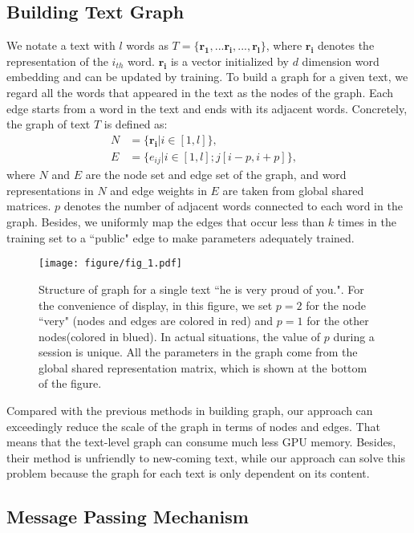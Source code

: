 \documentclass[11pt,a4paper]{article}
\begin{document}
\subsection{Building Text Graph}\label{graph_def}


We notate a text with $l$ words as $T=\{\mathbf{r_1},...\mathbf{r_i},...,\mathbf{r_l}\}$, where $\mathbf{r_i}$ denotes the representation of  the $i_{th}$ word.
$\mathbf{r_i}$ is a vector initialized by $d$ dimension word embedding and can be updated by training. To build a graph for a given text, we regard all the words that appeared in the text as the nodes of the graph. Each edge starts from a word in the text and ends with its adjacent words. Concretely, the graph of text $T$ is defined as:
\begin{align}
    N &= \{\mathbf{r_i}| i\in[1, l]  \},& \\
    E &= \{e_{ij}| i\in[1, l]; j[i-p, i+p]\},
\end{align}
where $N$ and $E$ are the node set and edge set of the graph, and word representations in $N$ and edge weights in $E$ are taken from global shared matrices. $p$ denotes the number of adjacent words connected to each word in the graph. Besides, we uniformly map the edges that occur less than $k$ times in the training set to a ``public" edge to make parameters adequately trained. 


\begin{figure}[t]
    \centering
    \texttt{[image: figure/fig\_1.pdf]}
    \caption{Structure of graph for a single text ``he is very proud of you.". For the convenience of display, in this figure, we set $p=2$ for the node ``very" (nodes and edges are colored in red) and  $p=1$ for the other nodes(colored in blued). In actual situations, the value of $p$ during a session is unique. All the parameters in the graph come from the global shared representation matrix, which is shown at the bottom of the figure.}
    \label{fig:main_flg}
\end{figure}
Compared with the previous methods in building graph, our approach can exceedingly reduce the scale of the graph in terms of nodes and edges. That means that the text-level graph can consume much less GPU memory. Besides, their method is unfriendly to new-coming text, while our approach can solve this problem because the graph for each text is only dependent on its content.


\subsection{Message Passing Mechanism}\label{sec:mpm}
\end{document}
